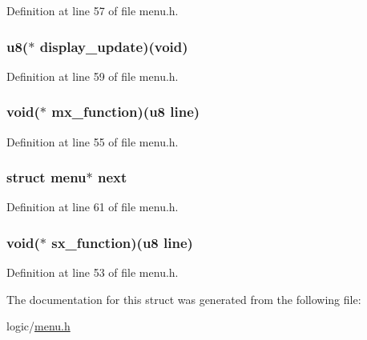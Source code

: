 \-Definition at line 57 of file menu.\-h.

\hypertarget{structmenu_ab8460526701ec3ad0a231a398a963882}{
\subsubsection[{display\-\_\-update}]{\setlength{\rightskip}{0pt plus 5cm}u8($\ast$ {\bf display\-\_\-update})(void)}}\label{structmenu_ab8460526701ec3ad0a231a398a963882}


\-Definition at line 59 of file menu.\-h.

\hypertarget{structmenu_a5e810089609d71c50a4fafb16304fc44}{
\subsubsection[{mx\-\_\-function}]{\setlength{\rightskip}{0pt plus 5cm}void($\ast$ {\bf mx\-\_\-function})(u8 line)}}\label{structmenu_a5e810089609d71c50a4fafb16304fc44}


\-Definition at line 55 of file menu.\-h.

\hypertarget{structmenu_aa35c173e9c9b7cab0ea757bbfd988893}{
\subsubsection[{next}]{\setlength{\rightskip}{0pt plus 5cm}struct {\bf menu}$\ast$ {\bf next}}}\label{structmenu_aa35c173e9c9b7cab0ea757bbfd988893}


\-Definition at line 61 of file menu.\-h.

\hypertarget{structmenu_ab821fa0d7f541480110bc8a674b42c79}{
\subsubsection[{sx\-\_\-function}]{\setlength{\rightskip}{0pt plus 5cm}void($\ast$ {\bf sx\-\_\-function})(u8 line)}}\label{structmenu_ab821fa0d7f541480110bc8a674b42c79}


\-Definition at line 53 of file menu.\-h.



\-The documentation for this struct was generated from the following file\-:\begin{DoxyCompactItemize}
\item 
logic/\hyperlink{menu_8h}{menu.\-h}\end{DoxyCompactItemize}
